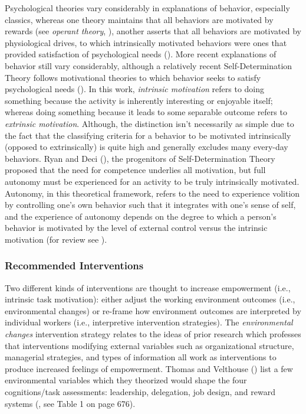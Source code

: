 \documentclass[
  11pt,
  a4paper,
]{article}
\begin{document}
Psychological theories vary considerably in explanations of behavior,
especially classics, whereas one theory maintains that all behaviors are
motivated by rewards (see \emph{operant theory},
), another asserts that all
behaviors are motivated by physiological drives, to which intrinsically
motivated behaviors were ones that provided satisfaction of
psychological needs (). More recent
explanations of behavior still vary considerably, although a relatively
recent Self-Determination Theory follows motivational theories to which
behavior seeks to satisfy psychological needs
(). In this work,
\emph{intrinsic motivation} refers to doing something because the
activity is inherently interesting or enjoyable itself; whereas doing
something because it leads to some separable outcome refers to
\emph{extrinsic motivation}. Although, the distinction isn't necessarily
as simple due to the fact that the classifying criteria for a behavior
to be motivated intrinsically (opposed to extrinsically) is quite high
and generally excludes many every-day behaviors. Ryan and Deci
(), the progenitors of Self-Determination
Theory proposed that the need for competence underlies all motivation,
but full autonomy must be experienced for an activity to be truly
intrinsically motivated. Autonomy, in this theoretical framework, refers
to the need to experience volition by controlling one's own behavior
such that it integrates with one's sense of self, and the experience of
autonomy depends on the degree to which a person's behavior is motivated
by the level of external control versus the intrinsic motivation (for
review see ).

\subsubsection{Recommended
Interventions}\label{recommended-interventions-1}

Two different kinds of interventions are thought to increase empowerment
(i.e., intrinsic task motivation): either adjust the working environment
outcomes (i.e., environmental changes) or re-frame how environment
outcomes are interpreted by individual workers (i.e., interpretive
intervention strategies). The \emph{environmental changes} intervention
strategy relates to the ideas of prior research which professes that
interventions modifying external variables such as organizational
structure, managerial strategies, and types of information all work as
interventions to produce increased feelings of empowerment. Thomas and
Velthouse () list a few environmental
variables which they theorized would shape the four cognitions/task
assessments: leadership, delegation, job design, and reward systems
(, see Table 1 on
page 676).
\end{document}
